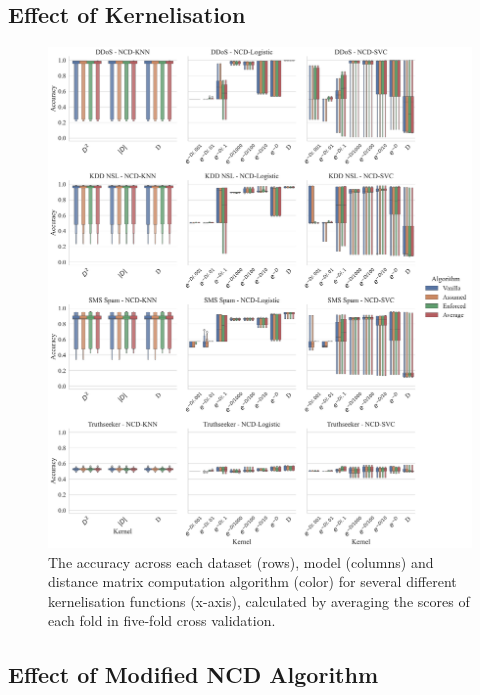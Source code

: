\documentclass[conference]{IEEEtran}
\begin{document}
\subsection{Effect of Kernelisation}
\lipsum[1]
\begin{figure}[htb]
    \centering
    \includegraphics[width=\textwidth]{images/accuracy_vs_kernel.pdf}
    \caption{The accuracy across each dataset (rows), model (columns) and distance matrix computation algorithm (color) for several different kernelisation functions (x-axis), calculated by averaging the scores of each fold in five-fold cross validation.}
    \label{fig:kernel_acc}
\end{figure}


\subsection{Effect of Modified NCD Algorithm}
\end{document}
